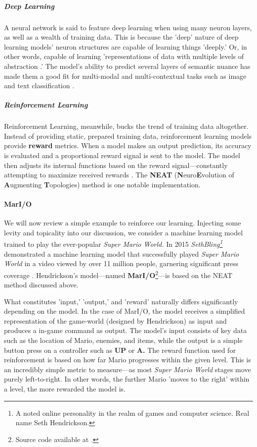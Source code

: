 \documentclass{report}
\newcommand{\tech}[1]{\textbf{#1}}
\begin{document}
\subparagraph{Deep Learning} 

A neural network is said to feature deep learning when using many neuron layers, as well as a wealth of training data. This is because the 'deep' nature of deep learning models' neuron structures are capable of learning things 'deeply.' Or, in other words, capable of learning 'representations of data with multiple levels of abstraction \cite{lecun2015deep}.' The model's ability to predict several layers of semantic nuance has made them a good fit for multi-modal and multi-contextual tasks such as image and text classification \cite{minaee2021deep}.

\subparagraph{Reinforcement Learning}

Reinforcement Learning, meanwhile, bucks the trend of training data altogether. Instead of providing static, prepared training data, reinforcement learning models provide \tech{reward} metrics. When a model makes an output prediction, its accuracy is evaluated and a proportional reward signal is sent to the model. The model then adjusts its internal functions based on the reward signal---constantly attempting to maximize received rewards \cite{kaelbling1996reinforcement}.   The \tech{NEAT} (\textbf{N}euro\textbf{E}volution of  \textbf{A}ugmenting \textbf{T}opologies) method \cite{NEAT} is one notable implementation.


\paragraph{MarI/O}

We will now review a simple example to reinforce our learning. Injecting some levity and topicality into our discussion, we consider a machine learning model trained to play the ever-popular \emph{Super Mario World.} In 2015 \emph{SethBling\footnote{A noted online personality in the realm of games and computer science. Real name Seth Hendrickson.}} demonstrated a machine learning model that successfully played \emph{Super Mario World} \cite{sethbling} in a video viewed by over 11 million people, garnering significant press coverage \cite{Souppouris_2015} \cite{Gallagher_2015}. Hendrickson's model---named \tech{MarI/O}\footnote{Source code available at \cite{Hendrickson_2015}.}---is based on the NEAT method discussed above.


What constitutes 'input,' 'output,' and 'reward' naturally differs significantly depending on the model. In the case of MarI/O, the model receives a simplified representation of the game-world (designed by Hendrickson) as input and produces a in-game command as output. The model's input consists of key data such as the location of Mario, enemies, and items, while the output is a simple button press on a controller such as \tech{UP} or \tech{A.} The reward function used for reinforcement is based on how far Mario progresses within the given level. This is an incredibly simple metric to measure---as most \emph{Super Mario World} stages move purely left-to-right. In other words, the further Mario 'moves to the right' within a level, the more rewarded the model is. 
\end{document}

